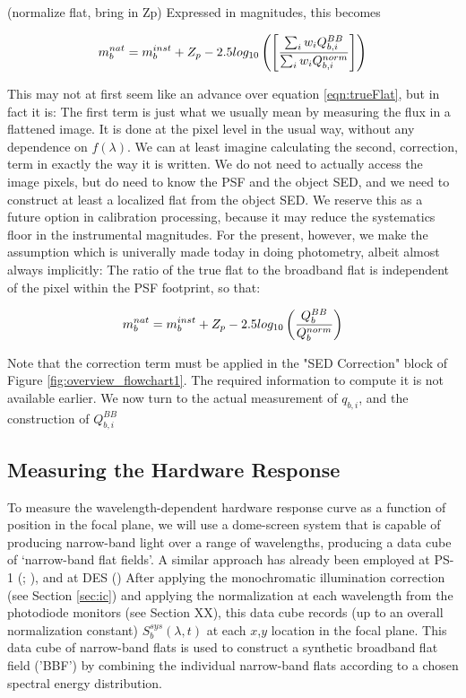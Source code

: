 \documentclass[12pt,preprint]{aastex}
\begin{document}
(normalize flat, bring in Zp) Expressed in magnitudes, this becomes

\begin{equation}
m_b^{nat} = m_b^{inst} + Z_p - 2.5 log_{10} \left( \left[ {\sum_i {w_i Q_{b,i}^{BB} }} \over {\sum_i {w_i Q_{b,i}^{norm} }}\right] \right)
\end{equation}


This may not at first seem like an advance over equation \ref{eqn:trueFlat}, but in fact it is:  The first term is just what we usually
mean by measuring the flux in a flattened image.  It is done at the pixel level in the usual way, without any dependence on 
$f(\lambda)$.  We can at least imagine calculating the second, correction, term in exactly the way it is written.  We do
not need to actually access the image pixels, but do need to know the PSF and the object SED, and we need to construct at least
a localized flat from the object SED.  We reserve this as a future option in calibration processing, because it may reduce
the systematics floor in the instrumental magnitudes.  For the present, however, we make the assumption which is univerally made
today in doing photometry, albeit almost always implicitly:  The ratio of the true flat to the broadband flat is independent 
of the pixel within the PSF footprint, so that:

\begin{equation}
m_b^{nat} =  m_b^{inst} + Z_p - 2.5 log_{10} \left( {Q_b^{BB}}  \over {Q_b^{norm}} \right) 
\label{eqn:flatCorrection}
\end{equation}

Note that the correction term must be applied in the "SED Correction" block of Figure \ref{fig:overview_flowchart1}.  The 
required information to compute it is not available earlier.  We now turn to the actual measurement of $q_{b,i}$, and the construction of $Q_{b,i}^{BB}$

\subsection{Measuring the Hardware Response}
To measure the wavelength-dependent hardware response
curve as a function of position in the focal plane, we will use a
dome-screen system that is capable of producing narrow-band light 
over a range of wavelengths, producing a data cube of `narrow-band flat
fields'.  A similar approach has already been employed at PS-1 (\citep{StubbsTonry2012}; \citep{Tonry2012}), 
and at DES (\citep{Marshall2013})
After applying the monochromatic illumination correction 
(see Section \ref{sec:ic}) and applying the normalization at each wavelength from
the photodiode monitors (see Section XX),  this data cube
records (up to an overall normalization constant) $S_b^{sys}(\lambda,t)$ at each $x$,$y$ location in the focal plane. 
This data cube of narrow-band
flats is used to construct a synthetic broadband flat field ('BBF') by
combining the individual narrow-band flats according to a chosen
spectral energy distribution.  
\end{document}
